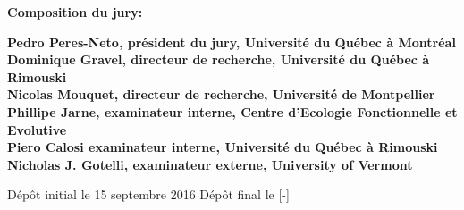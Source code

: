 \thispagestyle{empty}

\null
\vfill
\noindent \textbf{Composition du jury:}\\
\vspace{1cm}

\begin{singlespace}
  \noindent \textbf{Pedro Peres-Neto, président du jury, Université du Québec à Montréal}\\

  \noindent \textbf{Dominique Gravel, directeur de recherche, Université du Québec à Rimouski}\\

  \noindent \textbf{Nicolas Mouquet, directeur de recherche, Université de Montpellier}\\

  \noindent \textbf{Phillipe Jarne, examinateur interne, Centre d'Ecologie Fonctionnelle et Evolutive}\\

  \noindent \textbf{Piero Calosi examinateur interne, Université du Québec à Rimouski}\\

  \noindent \textbf{Nicholas J. Gotelli, examinateur externe, University of Vermont}\\
\end{singlespace}

\vspace{2cm}
\noindent Dépôt initial le 15 septembre 2016
\hspace{3cm}
Dépôt final le [-]


\cleardoublepage
